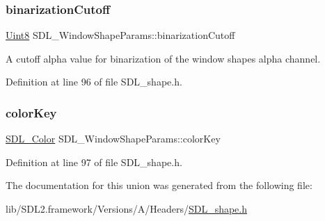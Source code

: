 \subsubsection{\texorpdfstring{binarizationCutoff}{binarizationCutoff}}
{\footnotesize\ttfamily \mbox{\hyperlink{_s_d_l__stdinc_8h_a2944638813a090aa23e62f4da842c3e2}{Uint8}} S\+D\+L\+\_\+\+Window\+Shape\+Params\+::binarization\+Cutoff}



A cutoff alpha value for binarization of the window shape\textquotesingle{}s alpha channel. 



Definition at line 96 of file S\+D\+L\+\_\+shape.\+h.

\mbox{\label{union_s_d_l___window_shape_params_a8bf3e442a51a1bbf452cfec7c1ed5318}} 
\subsubsection{\texorpdfstring{colorKey}{colorKey}}
{\footnotesize\ttfamily \mbox{\hyperlink{struct_s_d_l___color}{S\+D\+L\+\_\+\+Color}} S\+D\+L\+\_\+\+Window\+Shape\+Params\+::color\+Key}



Definition at line 97 of file S\+D\+L\+\_\+shape.\+h.



The documentation for this union was generated from the following file\+:\begin{DoxyCompactItemize}
\item 
lib/\+S\+D\+L2.\+framework/\+Versions/\+A/\+Headers/\mbox{\hyperlink{_s_d_l__shape_8h}{S\+D\+L\+\_\+shape.\+h}}\end{DoxyCompactItemize}
